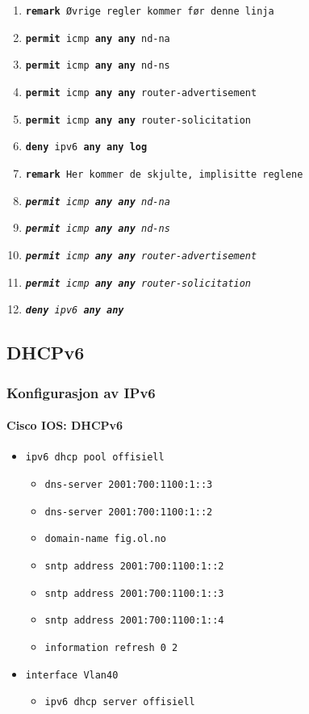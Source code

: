 \begin{frame}[allowframebreaks]
\begin{itemize}
\begin{enumerate}
    \item \texttt{\textbf{remark} Øvrige regler kommer før denne linja}
    \item \texttt{\textbf{permit} icmp \textbf{any any} nd-na}
    \item \texttt{\textbf{permit} icmp \textbf{any any} nd-ns}
    \item \texttt{\textbf{permit} icmp \textbf{any any} router-advertisement}
    \item \texttt{\textbf{permit} icmp \textbf{any any} router-solicitation}
    \item \texttt{\textbf{deny\phantom{it}} ipv6 \textbf{any any \alert{log}}}
    \item \texttt{\textbf{remark} Her kommer de skjulte, implisitte reglene}
    \item \texttt{\textit{\textbf{permit} icmp \textbf{any} \textbf{any} nd-na}}
    \item \texttt{\textit{\textbf{permit} icmp \textbf{any} \textbf{any} nd-ns}}
    \item \texttt{\textit{\textbf{permit} icmp \textbf{any} \textbf{any} router-advertisement}}
    \item \texttt{\textit{\textbf{permit} icmp \textbf{any} \textbf{any} router-solicitation}}
    \item \texttt{\textit{\textbf{deny\phantom{it}} ipv6 \textbf{any} \textbf{any}}}
    \end{enumerate}
  \end{itemize}
\end{frame}

\subsection{DHCPv6}
\begin{frame}%
  \frametitle{Konfigurasjon av IPv6}
  \framesubtitle{Cisco IOS: DHCPv6}
  \begin{itemize}%
  \item \texttt{ipv6 dhcp pool offisiell}
    \begin{itemize}%
    \item \texttt{dns-server 2001:700:1100:1::3}
    \item \texttt{dns-server 2001:700:1100:1::2}
    \item \texttt{domain-name fig.ol.no}
    \item \texttt{sntp address 2001:700:1100:1::2}
    \item \texttt{sntp address 2001:700:1100:1::3}
    \item \texttt{sntp address 2001:700:1100:1::4}
    \item \texttt{information refresh 0 2}
    \end{itemize}
  \item \texttt{interface Vlan40}
    \begin{itemize}%
    \item \texttt{ipv6 dhcp server offisiell}
    \end{itemize}
  \end{itemize}
\end{frame}


